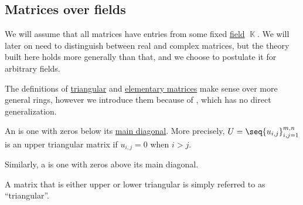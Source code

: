 \subsection{Matrices over fields}\label{subsec:matrices_over_fields}

We will assume that all matrices have entries from some fixed \hyperref[def:field]{field} \( \BbbK \). We will later on need to distinguish between real and complex matrices, but the theory built here holds more generally than that, and we choose to postulate it for arbitrary fields.

The definitions of \hyperref[def:triangular_matrix]{triangular} and \hyperref[def:triangular_matrix]{elementary matrices} make sense over more general rings, however we introduce them because of , which has no direct generalization.

\begin{definition}\label{def:triangular_matrix}
  An  is one with zeros below its \hyperref[def:matrix_diagonal]{main diagonal}. More precisely, \( U = \seq{ u_{i,j} }_{i,j=1}^{m,n} \) is an upper triangular matrix if \( u_{i,j} = 0 \) when \( i > j \).

  Similarly, a  is one with zeros above its main diagonal.

  A matrix that is either upper or lower triangular is simply referred to as \enquote{triangular}.
\end{definition}

